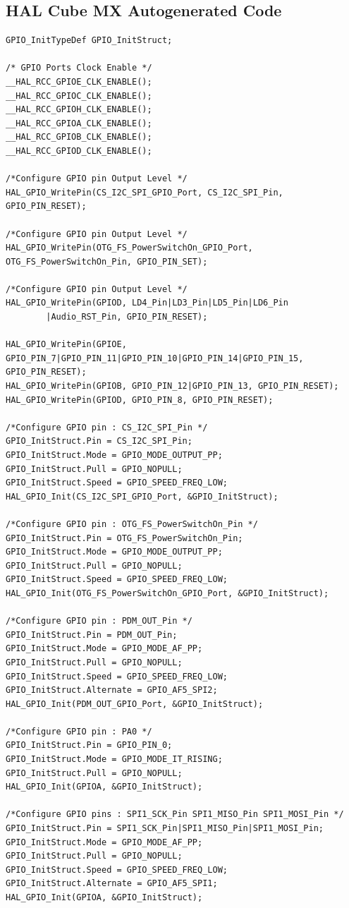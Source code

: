 \documentclass[12pt]{report}
\begin{document}
\begin{appendix}
	\newpage
	\chapter{HAL Cube MX Autogenerated Code}\label{mammoth}
	\begin{lstlisting}[basicstyle=\scriptsize\ttfamily]
GPIO_InitTypeDef GPIO_InitStruct;

/* GPIO Ports Clock Enable */
__HAL_RCC_GPIOE_CLK_ENABLE();
__HAL_RCC_GPIOC_CLK_ENABLE();
__HAL_RCC_GPIOH_CLK_ENABLE();
__HAL_RCC_GPIOA_CLK_ENABLE();
__HAL_RCC_GPIOB_CLK_ENABLE();
__HAL_RCC_GPIOD_CLK_ENABLE();

/*Configure GPIO pin Output Level */
HAL_GPIO_WritePin(CS_I2C_SPI_GPIO_Port, CS_I2C_SPI_Pin, GPIO_PIN_RESET);

/*Configure GPIO pin Output Level */
HAL_GPIO_WritePin(OTG_FS_PowerSwitchOn_GPIO_Port, OTG_FS_PowerSwitchOn_Pin, GPIO_PIN_SET);

/*Configure GPIO pin Output Level */
HAL_GPIO_WritePin(GPIOD, LD4_Pin|LD3_Pin|LD5_Pin|LD6_Pin 
		|Audio_RST_Pin, GPIO_PIN_RESET);

HAL_GPIO_WritePin(GPIOE, GPIO_PIN_7|GPIO_PIN_11|GPIO_PIN_10|GPIO_PIN_14|GPIO_PIN_15, GPIO_PIN_RESET);
HAL_GPIO_WritePin(GPIOB, GPIO_PIN_12|GPIO_PIN_13, GPIO_PIN_RESET);
HAL_GPIO_WritePin(GPIOD, GPIO_PIN_8, GPIO_PIN_RESET);

/*Configure GPIO pin : CS_I2C_SPI_Pin */
GPIO_InitStruct.Pin = CS_I2C_SPI_Pin;
GPIO_InitStruct.Mode = GPIO_MODE_OUTPUT_PP;
GPIO_InitStruct.Pull = GPIO_NOPULL;
GPIO_InitStruct.Speed = GPIO_SPEED_FREQ_LOW;
HAL_GPIO_Init(CS_I2C_SPI_GPIO_Port, &GPIO_InitStruct);

/*Configure GPIO pin : OTG_FS_PowerSwitchOn_Pin */
GPIO_InitStruct.Pin = OTG_FS_PowerSwitchOn_Pin;
GPIO_InitStruct.Mode = GPIO_MODE_OUTPUT_PP;
GPIO_InitStruct.Pull = GPIO_NOPULL;
GPIO_InitStruct.Speed = GPIO_SPEED_FREQ_LOW;
HAL_GPIO_Init(OTG_FS_PowerSwitchOn_GPIO_Port, &GPIO_InitStruct);

/*Configure GPIO pin : PDM_OUT_Pin */
GPIO_InitStruct.Pin = PDM_OUT_Pin;
GPIO_InitStruct.Mode = GPIO_MODE_AF_PP;
GPIO_InitStruct.Pull = GPIO_NOPULL;
GPIO_InitStruct.Speed = GPIO_SPEED_FREQ_LOW;
GPIO_InitStruct.Alternate = GPIO_AF5_SPI2;
HAL_GPIO_Init(PDM_OUT_GPIO_Port, &GPIO_InitStruct);

/*Configure GPIO pin : PA0 */
GPIO_InitStruct.Pin = GPIO_PIN_0;
GPIO_InitStruct.Mode = GPIO_MODE_IT_RISING;
GPIO_InitStruct.Pull = GPIO_NOPULL;
HAL_GPIO_Init(GPIOA, &GPIO_InitStruct);

/*Configure GPIO pins : SPI1_SCK_Pin SPI1_MISO_Pin SPI1_MOSI_Pin */
GPIO_InitStruct.Pin = SPI1_SCK_Pin|SPI1_MISO_Pin|SPI1_MOSI_Pin;
GPIO_InitStruct.Mode = GPIO_MODE_AF_PP;
GPIO_InitStruct.Pull = GPIO_NOPULL;
GPIO_InitStruct.Speed = GPIO_SPEED_FREQ_LOW;
GPIO_InitStruct.Alternate = GPIO_AF5_SPI1;
HAL_GPIO_Init(GPIOA, &GPIO_InitStruct);


\end{lstlisting}
\end{appendix}
\end{document}
